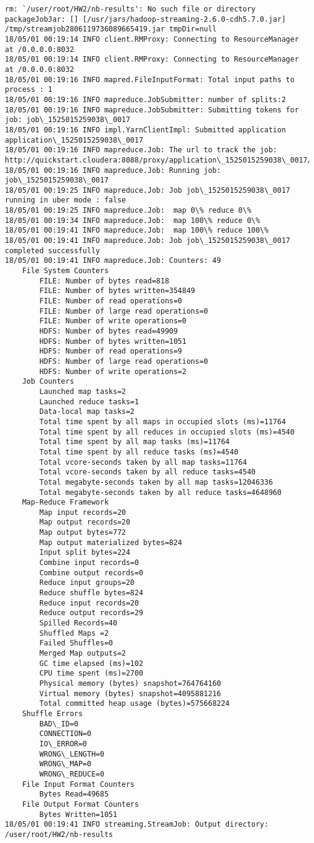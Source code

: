 \documentclass[11pt]{article}
\begin{document}
    \begin{Verbatim}[commandchars=\\\{\}]
rm: `/user/root/HW2/nb-results': No such file or directory
packageJobJar: [] [/usr/jars/hadoop-streaming-2.6.0-cdh5.7.0.jar] /tmp/streamjob2806119736089665419.jar tmpDir=null
18/05/01 00:19:14 INFO client.RMProxy: Connecting to ResourceManager at /0.0.0.0:8032
18/05/01 00:19:14 INFO client.RMProxy: Connecting to ResourceManager at /0.0.0.0:8032
18/05/01 00:19:16 INFO mapred.FileInputFormat: Total input paths to process : 1
18/05/01 00:19:16 INFO mapreduce.JobSubmitter: number of splits:2
18/05/01 00:19:16 INFO mapreduce.JobSubmitter: Submitting tokens for job: job\_1525015259038\_0017
18/05/01 00:19:16 INFO impl.YarnClientImpl: Submitted application application\_1525015259038\_0017
18/05/01 00:19:16 INFO mapreduce.Job: The url to track the job: http://quickstart.cloudera:8088/proxy/application\_1525015259038\_0017/
18/05/01 00:19:16 INFO mapreduce.Job: Running job: job\_1525015259038\_0017
18/05/01 00:19:25 INFO mapreduce.Job: Job job\_1525015259038\_0017 running in uber mode : false
18/05/01 00:19:25 INFO mapreduce.Job:  map 0\% reduce 0\%
18/05/01 00:19:34 INFO mapreduce.Job:  map 100\% reduce 0\%
18/05/01 00:19:41 INFO mapreduce.Job:  map 100\% reduce 100\%
18/05/01 00:19:41 INFO mapreduce.Job: Job job\_1525015259038\_0017 completed successfully
18/05/01 00:19:41 INFO mapreduce.Job: Counters: 49
	File System Counters
		FILE: Number of bytes read=818
		FILE: Number of bytes written=354849
		FILE: Number of read operations=0
		FILE: Number of large read operations=0
		FILE: Number of write operations=0
		HDFS: Number of bytes read=49909
		HDFS: Number of bytes written=1051
		HDFS: Number of read operations=9
		HDFS: Number of large read operations=0
		HDFS: Number of write operations=2
	Job Counters 
		Launched map tasks=2
		Launched reduce tasks=1
		Data-local map tasks=2
		Total time spent by all maps in occupied slots (ms)=11764
		Total time spent by all reduces in occupied slots (ms)=4540
		Total time spent by all map tasks (ms)=11764
		Total time spent by all reduce tasks (ms)=4540
		Total vcore-seconds taken by all map tasks=11764
		Total vcore-seconds taken by all reduce tasks=4540
		Total megabyte-seconds taken by all map tasks=12046336
		Total megabyte-seconds taken by all reduce tasks=4648960
	Map-Reduce Framework
		Map input records=20
		Map output records=20
		Map output bytes=772
		Map output materialized bytes=824
		Input split bytes=224
		Combine input records=0
		Combine output records=0
		Reduce input groups=20
		Reduce shuffle bytes=824
		Reduce input records=20
		Reduce output records=29
		Spilled Records=40
		Shuffled Maps =2
		Failed Shuffles=0
		Merged Map outputs=2
		GC time elapsed (ms)=102
		CPU time spent (ms)=2700
		Physical memory (bytes) snapshot=764764160
		Virtual memory (bytes) snapshot=4095881216
		Total committed heap usage (bytes)=575668224
	Shuffle Errors
		BAD\_ID=0
		CONNECTION=0
		IO\_ERROR=0
		WRONG\_LENGTH=0
		WRONG\_MAP=0
		WRONG\_REDUCE=0
	File Input Format Counters 
		Bytes Read=49685
	File Output Format Counters 
		Bytes Written=1051
18/05/01 00:19:41 INFO streaming.StreamJob: Output directory: /user/root/HW2/nb-results

    \end{Verbatim}
\end{document}
